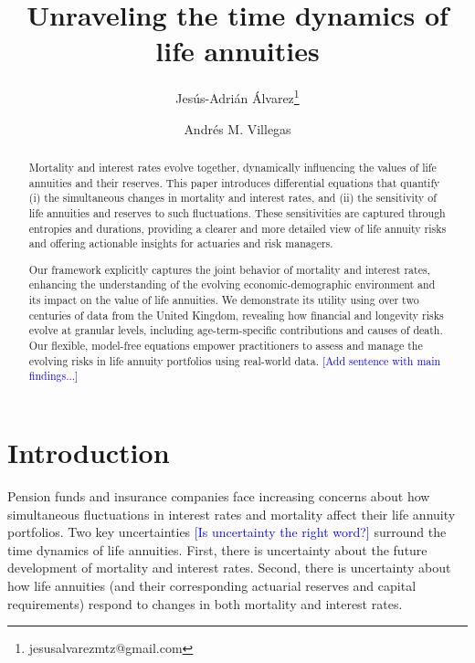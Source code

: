 \documentclass[12pt]{article}
\title{Unraveling the time dynamics of life annuities}
\author[1]{Jes\'us-Adri\'an \'Alvarez\thanks{jesusalvarezmtz@gmail.com}}
\author[2]{Andr\'es M. Villegas}
\affil[1]{{\small No affiliation} }
\affil[2]{\small{School of Risk and Actuarial Studies\\ UNSW Business School, UNSW Sydney, Australia}}
\newcommand{\note}[1]{\textcolor{blue}{[#1]}}
\begin{document}
\maketitle

{
\setcounter{tocdepth}{2}
}



\begin{abstract}
	
Mortality and interest rates evolve together, dynamically influencing the values of life annuities and their reserves. This paper introduces differential equations that quantify (i) the simultaneous changes in mortality and interest rates, and (ii) the sensitivity of life annuities and reserves to such fluctuations. These sensitivities are captured through entropies and durations, providing a clearer and more detailed view of life annuity risks and offering actionable insights for actuaries and risk managers.

Our framework explicitly captures the joint behavior of mortality and interest rates, enhancing the understanding of the evolving economic-demographic environment and its impact on the value of life annuities. We demonstrate its utility using over two centuries of data from the United Kingdom, revealing how financial and longevity risks evolve at granular levels, including age-term-specific contributions and causes of death. Our flexible, model-free equations empower practitioners to assess and manage the evolving risks in life annuity portfolios using real-world data. \note{Add sentence with main findings...}

	
\end{abstract}
\newpage
\section{Introduction}\label{sec:1_introduction}


Pension funds and insurance companies face increasing concerns about how simultaneous fluctuations in interest rates and mortality affect their life annuity portfolios. Two key uncertainties \note{Is uncertainty the right word?} surround the time dynamics of life annuities. First, there is uncertainty about the future development of mortality and interest rates. Second, there is uncertainty about how life annuities (and their corresponding actuarial reserves and capital requirements) respond to changes in both mortality and interest rates. 
\end{document}
